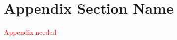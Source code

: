 \documentclass{acm_proc_article-sp}
\providecommand{\note}{\textcolor{red}} %
\begin{document}
\appendix
\section{Appendix Section Name} \label{sec:appendixLabel}
\note{Appendix needed}


% 
% 

\end{document}
